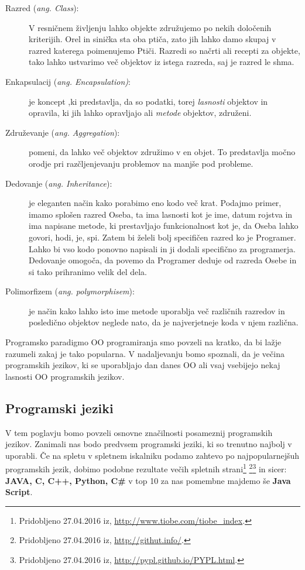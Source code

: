 \begin{description}
\item[Razred (\emph{ang. Class}):] V resničnem življenju lahko objekte
  združujemo po nekih določenih kriterijih. Orel in sinička sta oba
  ptiča, zato jih lahko damo skupaj v razred katerega poimenujemo
  Ptiči. Razredi so načrti ali recepti za objekte, tako lahko
  ustvarimo več objektov iz istega razreda, saj je razred le shma.
\item [Enkapsulacij (\emph{ang. Encapsulation)}:] je koncept ,ki
  predstavlja, da so podatki, torej \emph{lasnosti} objektov in
  opravila, ki jih lahko opravljajo ali \emph{metode} objektov,
  združeni.
\item [Združevanje (\emph{ang. Aggregation}):] pomeni, da lahko več
  objektov združimo v en objet. To predstavlja močno orodje pri
  razčljenjevanju problemov na manjše pod probleme.
\item [Dedovanje (\emph{ang. Inheritance}):] je eleganten način kako
  porabimo eno kodo več krat. Podajmo primer, imamo splošen razred
  Oseba, ta ima lasnosti kot je ime, datum rojstva in ima napisane
  metode, ki prestavljajo funkcionalnost kot je, da Oseba lahko
  govori, hodi, je, spi. Zatem bi želeli bolj specifičen razred ko je
  Programer. Lahko bi vso kodo ponovno napisali in ji dodali
  specifično za programerja. Dedovanje omogoča, da povemo da Programer
  deduje od razreda Osebe in si tako prihranimo velik del dela.
\item [Polimorfizem (\emph{ang. polymorphisem}):] je način kako lahko
  isto ime metode uporablja več različnih razredov in posledično
  objektov neglede nato, da je najverjetneje koda v njem
  različna.
\end{description}

Programsko paradigmo OO programiranja smo povzeli na kratko, da bi
lažje razumeli zakaj je tako popularna. V nadaljevanju bomo spoznali,
da je večina programskih jezikov, ki se uporabljajo dan danes OO ali
vsaj vsebijejo nekaj lasnosti OO programskih jezikov.

\subsection{Programski jeziki}
\label{sec:programski_jeziki}

V tem poglavju bomo povzeli osnovne značilnosti posameznij programskih
jezikov.  Zanimali nas bodo predvsem programski jeziki, ki so trenutno
najbolj v uporabli. Če na spletu v spletnem iskalniku podamo zahtevo
po najpopularnejšuh programskih jezik, dobimo podobne rezultate
večih spletnih strani\footnote{Pridobljeno 27.04.2016 iz,
  \url{http://www.tiobe.com/tiobe_index}.}  \footnote{Pridobljeno
  27.04.2016 iz, \url{http://githut.info/}.}\footnote{Pridobljeno
  27.04.2016 iz, \url{http://pypl.github.io/PYPL.html}.}  in sicer: \textbf{JAVA,
  C, C++, Python, C\#} v top 10 za nas pomembne majdemo še
\textbf{Java Script}. %

